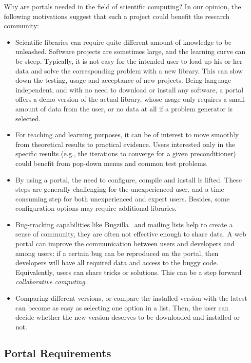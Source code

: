 \documentclass[11pt,relax]{SANDreport}
\begin{document}
Why are portals needed in the field of scientific computing? In
our opinion, the following motivations suggest that such a project could
benefit the research community:
\begin{itemize}
\setlength{\itemsep}{0pt}
\item Scientific libraries can require quite different amount
of knowledge to be unleashed. Software projects are sometimes large, and the
learning curve can be steep. Typically, it is not easy for the intended user
to load up his or her data and solve the corresponding problem with a new
library. This can slow down the testing, usage and acceptance of new 
projects. Being language-independent, and with no need to download or install
any software, a portal offers a demo version of the actual library, whose
usage only requires a small amount of data from the user, or no data at all if
a problem generator is selected.
%
\item For teaching and learning purposes, it can be of interest to move
smoothly from theoretical results to practical evidence.
Users interested only in the specific results 
(e.g., the iterations to converge for a given preconditioner) could benefit
from pop-down menus and common test problems.
%
\item By using a portal,
the need to configure, compile and install is lifted. These steps are
generally challenging  for
the unexperienced user, and a time-consuming step for both unexperienced and
expert users. Besides, some configuration options may require additional
libraries.
%
\item Bug-tracking capabilities like Bugzilla~\cite{bugzilla} and mailing
lists help to create a sense of community, they are often not effective enough
to share data. A web portal can improve the communication between users and
developers and among users: if a certain bug can be reproduced on the portal,
           then developers will have all required data and access to the buggy
           code. Equivalently, users can share tricks or solutions. This can
           be a step forward {\sl collaborative computing}.
%
\item Comparing different versions, or compare the installed version with the
latest can become as easy as selecting one option in a list. Then, the user
can decide whether the new version deserves to be downloaded and installed or
not.
\end{itemize}

\subsection{Portal Requirements}
\end{document}
